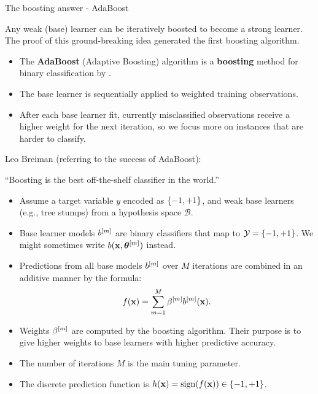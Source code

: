 \documentclass[11pt,compress,t,notes=noshow, xcolor=table]{beamer}
\begin{document}
\begin{vbframe}{The boosting answer - AdaBoost}

Any weak (base) learner can be iteratively boosted to become
a strong learner. %
The proof of this ground-breaking idea generated the first boosting algorithm.

\begin{itemize}
  \item The \textbf{AdaBoost} (Adaptive Boosting) algorithm is a \textbf{boosting} method
    for binary classification by .
  \item The base learner is sequentially applied to weighted training observations.
  \item After each base learner fit, currently misclassified observations receive a higher weight for
    the next iteration, so we focus more on instances that are harder to classify.
\end{itemize}

Leo Breiman (referring to the success of AdaBoost):

\enquote{Boosting is the best off-the-shelf classifier in the world.}

\framebreak

\begin{itemize}
  \item Assume a target variable $y$ encoded as $\{-1, +1\}$,
    and weak base learners (e.g., tree stumps) from a hypothesis space $\mathcal{B}$.
  \item Base learner models $b^{[m]}$ are binary classifiers that map to $\mathcal{Y} = \{-1, +1\}$.
    We might sometimes write $b(\mathbf{x}, \bm{\theta}^{[m]})$ instead.
  \item Predictions from all base models $b^{[m]}$ over $M$ iterations are combined in an additive manner by the formula:
    $$
    f(\mathbf{x}) = \sum_{m=1}^{M} \beta^{[m]} b^{[m]}(\mathbf{x}).
    $$
  \item Weights $\beta^{[m]}$ are computed by the boosting algorithm.
    Their purpose is to give higher weights to base learners with higher predictive accuracy.
  \item The number of iterations $M$ is the main tuning parameter.
  \item The discrete prediction function is $h(\mathbf{x}) = \text{sign}(f(\mathbf{x})) \in \{-1, +1\}$.
\end{itemize}


\end{vbframe}
\end{document}
